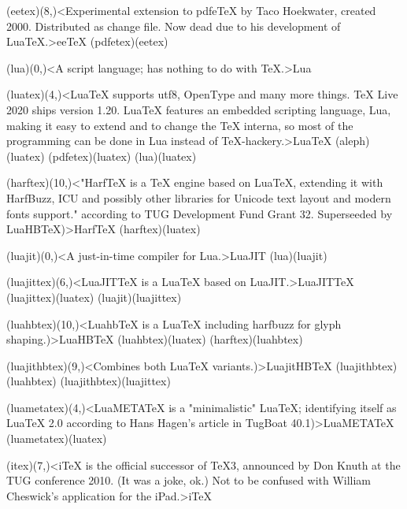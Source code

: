 {	\steplayer[-1.5]

	\tonode[\experimental](eetex)(8,\layer)<Experimental extension to pdfeTeX by Taco Hoekwater, created 2000. Distributed as change file. Now dead due to his development of LuaTeX.>{ee\TeX}
		\todraw(pdfetex)(eetex)
	
	\steplayer[-0.5]

	\tonode[\program](lua)(0,\layer)<A script language; has nothing to do with TeX.>{Lua}
	
	\tonode[\vip](luatex)(4,\layer)<LuaTeX supports utf8, OpenType and many more things. TeX Live 2020 ships version 1.20. LuaTeX features an embedded scripting language, Lua, making it easy to extend and to change the TeX interna, so most of the programming can be done in Lua instead of TeX-hackery.>{Lua\TeX}
		\todraw(aleph)(luatex)
		\todraw*(pdfetex)(luatex)
		\todraw[dashed](lua)(luatex)
	\steplayer[-1]
		
	\tonode[\experimental](harftex)(10,\layer)<"HarfTeX is a TeX engine based on LuaTeX, extending it with HarfBuzz, ICU and possibly other libraries for Unicode text layout and modern fonts support." according to TUG Development Fund Grant 32. Superseeded by LuaHBTeX)>{Harf\TeX}
		\todraw(harftex)(luatex)		

	\steplayer[-1.5]
	\tonode[\program](luajit)(0,\layer)<A just-in-time compiler for Lua.>{LuaJIT}
		\todraw(lua)(luajit)

	\tonode[\experimental](luajittex)(6,\layer)<LuaJITTeX is a LuaTeX based on LuaJIT.>{LuaJIT\TeX}
		\todraw(luajittex)(luatex)
		\todraw[dashed](luajit)(luajittex)

	\tonode[\vip](luahbtex)(10,\layer)<LuahbTeX is a LuaTeX including harfbuzz for glyph shaping.)>{LuaHB\TeX}
		\todraw*(luahbtex)(luatex)
		\todraw(harftex)(luahbtex)			
		
	\steplayer[-1.5]
	\tonode[\experimental](luajithbtex)(9,\layer)<Combines both LuaTeX variants.)>{LuajitHB\TeX}
		\todraw(luajithbtex)(luahbtex)
		\todraw(luajithbtex)(luajittex)

	\tonode[\experimental](luametatex)(4,\layer)<LuaMETATeX is a "minimalistic" LuaTeX; identifying itself as LuaTeX 2.0 according to Hans Hagen's article in TugBoat 40.1)>{LuaMETA\TeX}
		\todraw(luametatex)(luatex)			

	\steplayer[-2.5]
	\tonode[\experimental](itex)(7,\layer)<iTeX is the official successor of TeX3, announced by Don Knuth at the TUG conference 2010. (It was a joke, ok.) Not to be confused with William Cheswick's application for the iPad.>{i\TeX}
}
\vfill

